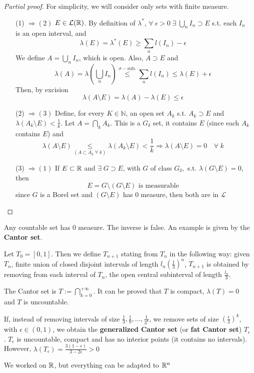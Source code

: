 \begin{proof}[Partial proof]
    For simplicity, we will consider only sets with finite measure.
    \begin{itemize}
        \item[(1)]\( \Rightarrow (2)\) \(E \in \mathcal{L}(\mathbb{R})\). By definition of \(\lambda^*\), \(\forall \; \epsilon > 0 \; \exists \; \bigcup_n I_n \supset E\) s.t. each \(I_n\) is an open interval, and 
        \[
            \lambda(E) = \lambda^*(E) \geq \sum_n l(I_n) -\epsilon
        \]
        We define \(A = \bigcup_n I_n\), which is open. Also, \(A \supset E\) and 
        \[
            \lambda(A)= \lambda\left(\bigcup_n I_n\right) \overset{\sigma-\mbox{sub.}}{\leq} \sum_n l(I_n) \leq \lambda(E) + \epsilon
        \]
        Then, by excision
        \[
            \lambda(A \setminus E) = \lambda(A) - \lambda(E) \leq \epsilon
        \]
        \item[(2)]\( \Rightarrow (3)\) Define, for every \(K \in \mathbb{N}\), an open set \(A_k\) s.t. \(A_k \supset E\) and \(\lambda(A_k \setminus E) < \frac{1}{k}\). Let \(A = \bigcap_k A_k\). This is a \(G_{\delta}\) set, it contains \(E\) (since each \(A_k\) contains \(E\)) and 
        \[
            \lambda(A \setminus E) \underset{(A \subset A_k \; \forall \; k)}{\leq} \lambda(A_k \setminus E) < \frac{1}{k} \Rightarrow \lambda(A \setminus E) = 0 \quad \forall \; k
        \]
        \item[(3)]\( \Rightarrow (1)\) If \(E \subset \mathbb{R}\) and \(\exists\; G \supset E\), with \(G\) of class \(G_{\delta},\) s.t. \(\lambda(G \setminus E) = 0\), then
        \[
            E = G \setminus(G \setminus E) \mbox{ is measurable}
        \]
        since \(G\) is a Borel set and \((G \setminus E)\) has \(0\) measure, then both are in \(\mathcal{L}\)
    \end{itemize}
\end{proof}
\begin{remark}
    Any countable set has \(0\) measure. The inverse is false. An example is given by the \textbf{Cantor set}.
    
    Let \(T_0 = [0,1]\). Then we define \(T_{n+1}\) stating from \(T_n\) in the following way:
    given \(T_n\), finite union of closed disjoint intervals of length \(l_n (\frac{1}{3})^n\), \(T_{n+1}\) is obtained by removing from each interval of \(T_n\), the open central subinterval of length \(\frac{l_n}{3}\).

    The Cantor set is \(T := \bigcap_{k=0}^{+\infty}\). It can be proved that \(T\) is compact, \(\lambda(T) = 0\) and \(T\) is uncountable.

    If, instead of removing intervals of size \(\frac{1}{3}, \frac{1}{9}, \ldots, \frac{1}{3^k}\), we remove sets of size \(\left(\frac{\epsilon}{3}\right)^k\), with \(\epsilon \in (0,1)\), we obtain the \textbf{generalized Cantor set} (or \textbf{fat Cantor set}) \(T_{\epsilon}\). \(T_{\epsilon}\) is uncountable, compact and has no interior points (it contains no intervals). However, \(\lambda(T_{\epsilon}) = \frac{3(1 -\epsilon)}{3 - 2\epsilon} > 0\)
\end{remark}
\begin{remark}
    We worked on \(\mathbb{R}\), but everything can be adapted to \(\mathbb{R}^n\)
\end{remark}
